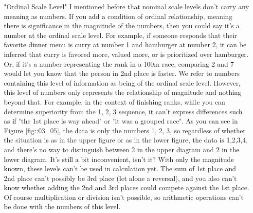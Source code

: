 \documentclass{ltjsbook}
\begin{document}
"Ordinal Scale Level"
I mentioned before that nominal scale levels don't carry any meaning as numbers. If you add a condition of ordinal relationship, meaning there is significance in the magnitude of the numbers, then you could say it's a number at the ordinal scale level. For example, if someone responds that their favorite dinner menu is curry at number 1 and hamburger at number 2, it can be inferred that curry is favored more, valued more, or is prioritized over hamburger. Or, if it's a number representing the rank in a 100m race, comparing 2 and 7 would let you know that the person in 2nd place is faster. We refer to numbers containing this level of information as being of the ordinal scale level. However, this level of numbers only represents the relationship of magnitude and nothing beyond that. For example, in the context of finishing ranks, while you can determine superiority from the 1, 2, 3 sequence, it can't express differences such as if "the 1st place is way ahead" or "it was a grouped race". As you can see in Figure \ref{fig::03_05}, the data is only the numbers 1, 2, 3, so regardless of whether the situation is as in the upper figure or as in the lower figure, the data is 1,2,3,4, and there's no way to distinguish between 2 in the upper diagram and 2 in the lower diagram. It's still a bit inconvenient, isn't it? With only the magnitude known, these levels can't be used in calculation yet. The sum of 1st place and 2nd place can't possibly be 3rd place (let alone a reversal), and you also can't know whether adding the 2nd and 3rd places could compete against the 1st place. Of course multiplication or division isn't possible, so arithmetic operations can't be done with the numbers of this level.
\end{document}
